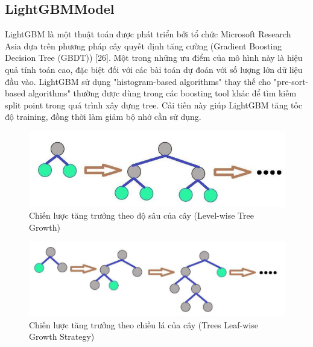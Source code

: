 \documentclass[conference]{IEEEtran}
\begin{document}
\subsection{LightGBMModel}
LightGBM là một thuật toán được phát triển bởi tổ chức Microsoft Research Asia dựa trên phương pháp cây quyết định tăng cường (Gradient Boosting Decision Tree (GBDT)) [26]. Một trong những ưu điểm của mô hình này là hiệu quả tính toán cao, đặc biệt đối với các bài toán dự đoán với số lượng lớn dữ liệu đầu vào. LightGBM sử dụng "histogram-based algorithms" thay thế cho "pre-sort-based algorithms" thường được dùng trong các boosting tool khác để tìm kiếm split point trong quá trình xây dựng tree. Cải tiến này giúp LightGBM tăng tốc độ training, đồng thời làm giảm bộ nhớ cần sử dụng. 
\begin{figure}[H]
    \centering
    \begin{minipage}{0.5\textwidth}
    \centering
    \includegraphics[width=1\textwidth]{Image/Level-wise Tree Growth.png}
    \caption{Chiến lược tăng trưởng theo độ sâu của cây (Level-wise Tree Growth)}
    \label{fig:1}
    \end{minipage}
\end{figure}
\begin{figure}[H]
    \centering
    \begin{minipage}{0.5\textwidth}
    \centering
    \includegraphics[width=1\textwidth]{Image/Trees Leaf-wise Growth Strategy.png}
    \caption{Chiến lược tăng trưởng theo chiều lá của cây (Trees Leaf-wise Growth Strategy)}
    \label{fig:1}
    \end{minipage}
\end{figure}
\end{document}
